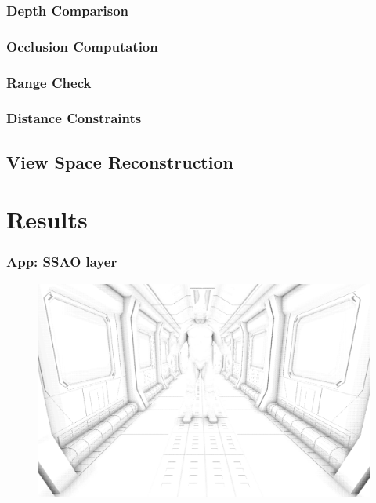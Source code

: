 \documentclass{beamer}
\begin{document}
\begin{frame}
\frametitle{Depth Comparison}

\end{frame}

\begin{frame}
\frametitle{Occlusion Computation}

\end{frame}


\subsubsection{Range Check}
\subsubsection{Distance Constraints}


\subsection{View Space Reconstruction}

\section{Results}

\begin{frame}
\frametitle{App: SSAO layer}
\begin{figure}
    \centering
    \includegraphics[width=0.95\linewidth]{images/app_ssao}
\end{figure}

\end{frame}
\end{document}
